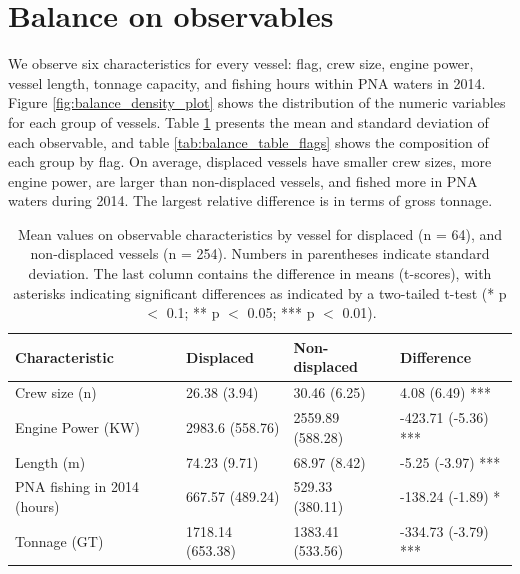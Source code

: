 \documentclass[12pt]{article}
\begin{document}
\section{Balance on observables}

We observe six characteristics for every vessel: flag, crew size, engine power, vessel length, tonnage capacity, and fishing hours within PNA waters in 2014. Figure \ref{fig:balance_density_plot} shows the distribution of the numeric variables for each group of vessels. Table \ref{tab:balance_table} presents the mean and standard deviation of each observable, and table \ref{tab:balance_table_flags} shows the composition of each group by flag. On average, displaced vessels have smaller crew sizes, more engine power, are larger than non-displaced vessels, and fished more in PNA waters during 2014. The largest relative difference is in terms of gross tonnage. 

\begin{table}[H]
\caption{\label{tab:balance_table}Mean values on observable characteristics by vessel for displaced (n = 64), and non-displaced vessels (n = 254). Numbers in parentheses indicate standard deviation. The last column contains the difference in means (t-scores), with asterisks indicating significant differences as indicated by a two-tailed t-test (* p $<$ 0.1; ** p $<$ 0.05; *** p $<$ 0.01).}
\centering
\begin{tabular}{l|l|l|l}
\hline
Characteristic & Displaced & Non-displaced & Difference\\
\hline
Crew size (n) & 26.38 (3.94) & 30.46 (6.25) & 4.08 (6.49) ***\\
\hline
Engine Power (KW) & 2983.6 (558.76) & 2559.89 (588.28) & -423.71 (-5.36) ***\\
\hline
Length (m) & 74.23 (9.71) & 68.97 (8.42) & -5.25 (-3.97) ***\\
\hline
PNA fishing in 2014 (hours) & 667.57 (489.24) & 529.33 (380.11) & -138.24 (-1.89) *\\
\hline
Tonnage (GT) & 1718.14 (653.38) & 1383.41 (533.56) & -334.73 (-3.79) ***\\
\hline
\end{tabular}
\end{table}
\end{document}
